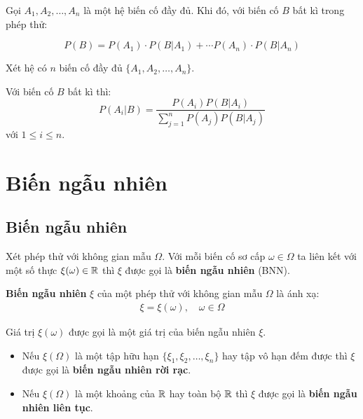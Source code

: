 \begin{theorem}
    Gọi $A_1, A_2, \ldots, A_n$ là một hệ biến cố đầy đủ. Khi đó, với biến cố $B$ bất kì trong phép thử: 
    
    \begin{equation}    
        P(B) = P(A_1) \cdot P(B | A_1) + \cdots P(A_n) \cdot P(B | A_n)
    \end{equation}
\end{theorem}

\begin{theorem}
    Xét hệ có $n$ biến cố đầy đủ $\{ A_1, A_2, \ldots, A_n \}$. 
    
    Với biến cố $B$ bất kì thì: \[P(A_i | B) = \frac{P(A_i) P(B | A_i)}{\displaystyle{\sum_{j=1}^n P(A_j) P(B | A_j)}}\] với $1 \leq i \leq n$.
\end{theorem}

\section{Biến ngẫu nhiên}

\subsection*{Biến ngẫu nhiên}

Xét phép thử với không gian mẫu $\Omega$. Với mỗi biến cố sơ cấp $\omega \in \Omega$ ta liên kết với một số thực $\xi(\omega) \in \mathbb{R}$ thì $\xi$ được gọi là \textbf{biến ngẫu nhiên} (BNN).

\begin{definition}
    \textbf{Biến ngẫu nhiên} $\xi$ của một phép thử với không gian mẫu $\Omega$ là ánh xạ: 
    \begin{equation*}
        \begin{split}
            \xi = \xi (\omega), \quad \omega \in \Omega
        \end{split}
    \end{equation*}
\end{definition}
    
Giá trị $\xi(\omega)$ được gọi là một giá trị của biến ngẫu nhiên $\xi$.

\begin{itemize}
    \item Nếu $\xi(\Omega)$ là một tập hữu hạn $\{\xi_1, \xi_2, \ldots,\xi_n\}$ hay tập vô hạn đếm được thì $\xi$ được gọi là \textbf{biến ngẫu nhiên rời rạc}.
    \item Nếu $\xi(\Omega)$ là một khoảng của $\mathbb{R}$ hay toàn bộ $\mathbb{R}$ thì $\xi$ được gọi là \textbf{biến ngẫu nhiên liên tục}.
\end{itemize}

